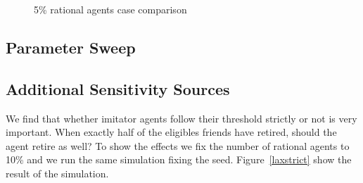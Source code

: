 \documentclass[runningheads,a4paper]{llncs}
\begin{document}
\begin{figure}
\centering

\caption{5\% rational agents case comparison}
\label{figure5}
\end{figure}

\subsection{Parameter Sweep}

\subsection{Additional Sensitivity Sources}

We find that whether imitator agents follow their threshold strictly or not is very important.
When exactly half of the eligibles friends have retired, should the agent retire as well?
To show the effects we fix the number of rational agents to 10\% and we run the same simulation fixing the seed.
Figure~\ref{laxstrict} show the result of the simulation.
\end{document}
